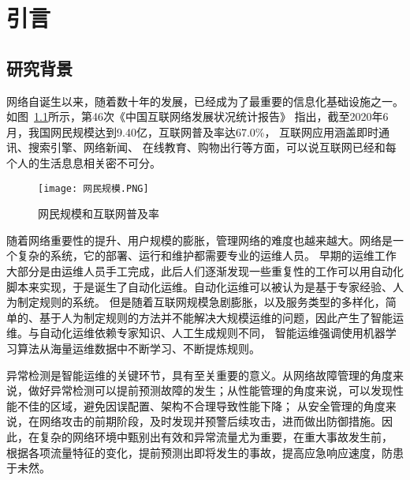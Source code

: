 
\chapter{引言}


\section{研究背景}

网络自诞生以来，随着数十年的发展，已经成为了最重要的信息化基础设施之一。如图~\ref{fig:example}所示，第46次《中国互联网络发展状况统计报告》\cite{cac.gov} 指出，截至2020年6月，我国网民规模达到9.40亿，互联网普及率达67.0\%，
互联网应用涵盖即时通讯、搜索引擎、网络新闻、 在线教育、购物出行等方面，可以说互联网已经和每个人的生活息息相关密不可分。

\begin{figure}
    \centering
    \texttt{[image: 网民规模.PNG]}
    \caption{网民规模和互联网普及率}
    \label{fig:example}
  \end{figure}

随着网络重要性的提升、用户规模的膨胀，管理网络的难度也越来越大。网络是一个复杂的系统，它的部署、运行和维护都需要专业的运维人员。
早期的运维工作大部分是由运维人员手工完成，此后人们逐渐发现一些重复性的工作可以用自动化脚本来实现，于是诞生了自动化运维。自动化运维可以被认为是基于专家经验、人为制定规则的系统。
但是随着互联网规模急剧膨胀，以及服务类型的多样化，简单的、基于人为制定规则的方法并不能解决大规模运维的问题，因此产生了智能运维。与自动化运维依赖专家知识、人工生成规则不同，
智能运维强调使用机器学习算法从海量运维数据中不断学习、不断提炼规则。

异常检测是智能运维的关键环节，具有至关重要的意义。从网络故障管理的角度来说，做好异常检测可以提前预测故障的发生；从性能管理的角度来说，可以发现性能不佳的区域，避免因误配置、架构不合理导致性能下降；
从安全管理的角度来说，在网络攻击的前期阶段，及时发现并预警后续攻击，进而做出防御措施。因此，在复杂的网络环境中甄别出有效和异常流量尤为重要，在重大事故发生前，
根据各项流量特征的变化，提前预测出即将发生的事故，提高应急响应速度，防患于未然。



